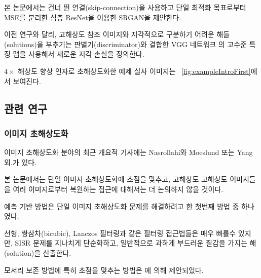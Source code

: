 \documentclass[10pt,twocolumn,letterpaper]{article}
\newcommand{\kor}[1]{#1}
\newcommand{\eng}[1]{}
\begin{document}
\eng{
In this work we propose a \ac{SRGAN} for which we employ a deep \ac{ResNet} with skip-connection and diverge from \ac{MSE} as the sole optimization target.
}\kor{
본 논문에서는 건너 뛴 연결(skip-connection)을 사용하고 단일 최적화 목표로부터 \ac{MSE}를 분리한 심층 \ac{ResNet}을 이용한 \ac{SRGAN}을 제안한다.
}\eng{
 Different from previous works, we define a novel perceptual loss using high-level feature maps of the VGG network \cite{simonyan2014very,Johnson16PercepLoss,bruna2016super} combined with a discriminator that encourages solutions perceptually hard to distinguish from the \ac{HR} reference images.
}\kor{
 이전 연구와 달리, \ac{고해상도} 참조 이미지와 지각적으로 구분하기 어려운 해들(solutions)을 부추기는 판별기(discriminator)와 결합한 VGG 네트워크 \cite{simonyan2014very,Johnson16PercepLoss,bruna2016super}의 고수준 특징 맵을 사용해서 새로운 지각 손실을 정의한다.
}
\eng{
An example photo-realistic image that was super-resolved with a $4\times$ upscaling factor is shown in \figurename~\ref{fig:exampleIntroFirst}.
}\kor{
$4\times$ 해상도 향상 인자로 초해상도화한 예제 실사 이미지는 \figurename~\ref{fig:exampleIntroFirst}에서 보여진다.
}

\subsection{관련 연구}
\subsubsection{이미지 초해상도화}
\eng{
Recent overview articles on image \ac{SR} include Nasrollahi and Moeslund \cite{Nasrollahi2014} or Yang et al. \cite{Yang14benchmark}.
}\kor{
이미지 \ac{초해상도화} 분야의 최근 개요적 기사에는 Nasrollahi와 Moeslund \cite{Nasrollahi2014} 또는 Yang 외.가 있다.
}\eng{
Here we will focus on \ac{SISR} and will not further discuss approaches that recover \ac{HR} images from multiple images \cite{Borman1998aSurvey,Farsiu2004}.
}\kor{
본 논문에서는 \ac{단일 이미지 초해상도화}에 초점을 맞추고, 고해상도 \ac{고해상도} 이미지들을 여러 이미지로부터 복원하는 \cite{Borman1998aSurvey,Farsiu2004} 접근에 대해서는 더 논의하지 않을 것이다.
}


\eng{
Prediction-based methods were among the first methods to tackle \ac{SISR}.
}\kor{
예측 기반 방법은 \ac{단일 이미지 초해상도화} 문제를 해결하려고 한 첫번째 방법 중 하나였다.
} \eng{
While these filtering approaches, \eg linear, bicubic or Lanczos \cite{Duchon1979} filtering, can be very fast, they oversimplify the \ac{SISR} problem and usually yield solutions with overly smooth textures.
}\kor{
\eg 선형, 쌍삼차(bicubic), Lanczos \cite{Duchon1979} 필터링과 같은 필터링 접근법들은 매우 빠를수 있지만, \ac{SISR} 문제를 지나치게 단순화하고, 일반적으로 과하게 부드러운 질감을 가지는 해(solution)을 산출한다.
}
\eng{
Methods that put particularly focus on edge-preservation have been proposed \cite{Allebach96, Li2001}.
}\kor{
모서리 보존 방법에 특히 초점을 맞추는 방법은 \cite{Allebach96, Li2001}에 의해 제안되었다.
}
\end{document}

